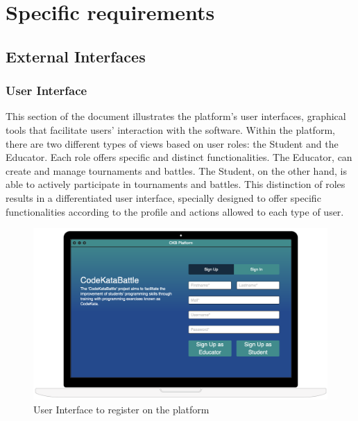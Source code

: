 \section{Specific requirements}

\subsection{External Interfaces}

\subsubsection{User Interface}
This section of the document illustrates the platform's user interfaces, graphical tools that facilitate users' interaction with the software.
\newline
Within the platform, there are two different types of views based on user roles: the Student and the Educator. Each role offers specific and distinct functionalities.
\newline
The Educator, can create and manage tournaments and battles. The Student, on the other hand, is able to actively participate in tournaments and battles.
\newline
This distinction of roles results in a differentiated user interface, specially designed to offer specific functionalities according to the profile and actions allowed to each type of user.
\vspace{0.5\baselineskip}

\begin{figure}[h]
    \centering
    \includegraphics[scale=0.45]{images/Mockup/SignUpMockup.png} 
    \caption{User Interface to register on the platform}
    \label{fig_SignUpMockup}
\end{figure}

